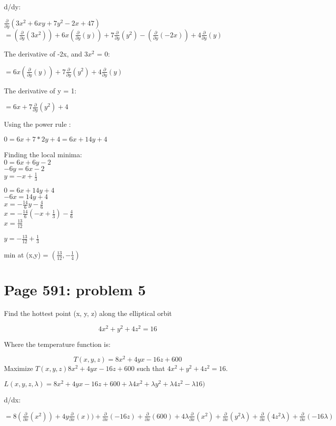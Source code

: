 \documentclass[]{article}
\begin{document}
d/dy:

\(\frac{\partial}{\partial y}(3x^2 + 6xy + 7y^2 - 2x + 47)\)\\
\(= (\frac{\partial}{\partial y}(3x^2)) + 6x(\frac{\partial}{\partial y}(y)) + 7\frac{\partial}{\partial y}(y^2) - (\frac{\partial}{\partial y}(-2x)) + 4\frac{\partial}{\partial y}(y)\)

The derivative of -2x, and \(3x^2\) = 0:

\(= 6x(\frac{\partial}{\partial y}(y)) + 7\frac{\partial}{\partial y}(y^2) + 4\frac{\partial}{\partial y}(y)\)

The derivative of y = 1:

\(= 6x + 7\frac{\partial}{\partial y}(y^2) + 4\)

Using the power rule :

\(0 = 6x + 7*2y + 4 = 6x + 14y + 4\)

Finding the local minima:\\
\(0 = 6x + 6y -2\)\\
\(-6y = 6x - 2\)\\
\(y = -x + \frac{1}{3}\)

\(0 = 6x + 14y + 4\)\\
\(-6x = 14y + 4\)\\
\(x = -\frac{14}{6}y - \frac{4}{6}\)\\
\(x = -\frac{14}{6}(-x + \frac{1}{3}) - \frac{4}{6}\)\\
\(x = \frac{13}{12}\)

\(y = - \frac{13}{12} + \frac{1}{3}\)

min at (x,y) = \((\frac{13}{12}, -\frac{1}{4})\)

\newpage

\section{Page 591: problem 5}\label{page-591-problem-5}

Find the hottest point (x, y, z) along the elliptical orbit

\[4x^2 +y^2 +4z^2 = 16\]

Where the temperature function is:

\[T(x,y,z) = 8x^2 + 4yx - 16z + 600\] Maximize
\(T(x,y,z) 8x^2 + 4yx - 16z + 600\) such that \(4x^2 +y^2 +4z^2 = 16\).

\(L(x,y,z,\lambda) = 8x^2 + 4yx - 16z + 600 + \lambda 4x^2 + \lambda y^2 +\lambda 4z^2 -\lambda 16)\)

d/dx:

\(= 8 (\frac{\partial}{\partial x}(x^2)) + 4y\frac{\partial}{\partial x}(x)) + \frac{\partial}{\partial x}(- 16z) + \frac{\partial}{\partial x}(600) + 4 \lambda \frac{\partial}{\partial x}(x^2) + \frac{\partial}{\partial x}(y^2\lambda) + \frac{\partial}{\partial x} (4z^2\lambda) + \frac{\partial}{\partial x} (-16 \lambda)\)
\end{document}
